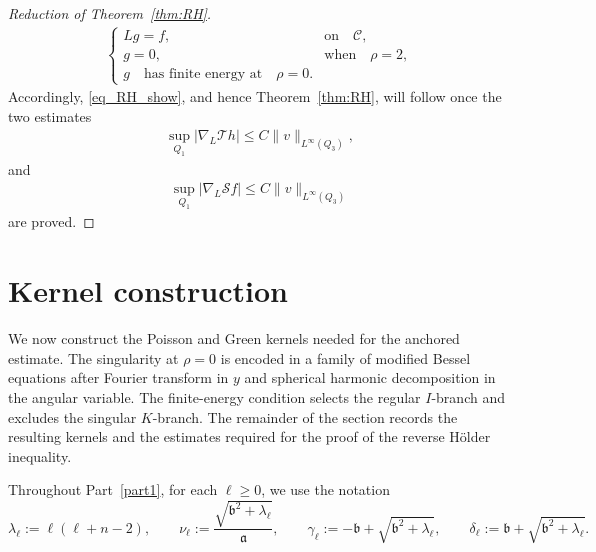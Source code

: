 \documentclass[12pt]{amsart}
\begin{document}
\begin{proof}[Reduction of Theorem~\ref{thm:RH}]
\begin{align}
\begin{cases}
Lg = f, & \textrm{on}\quad \mathcal{C},\\
g = 0, & \textrm{when}\quad \rho=2,\\
g\quad \textrm{has finite energy at}\quad \rho=0.
\end{cases}
\end{align}
Accordingly, \eqref{eq_RH_show}, and hence Theorem~\ref{thm:RH}, will follow once the two estimates
\begin{align*}
\sup_{Q_1} |\nabla_L \mathcal{T}h| \le C \| v \|_{L^\infty(Q_3)},
\end{align*}
and
\begin{align*}
\sup_{Q_1} |\nabla_L \mathcal{S}f| \le C \| v \|_{L^\infty(Q_3)}
\end{align*}
are proved.
\end{proof}





















\section{Kernel construction}



We now construct the Poisson and Green kernels needed for the anchored estimate. The singularity at $\rho=0$ is encoded in a family of modified Bessel equations after Fourier transform in $y$ and spherical harmonic decomposition in the angular variable. The
finite-energy condition selects the regular $I$-branch and excludes the singular $K$-branch. The remainder of the section records the resulting kernels and the estimates required for the proof of the reverse H\"older inequality.


Throughout Part~\ref{part1}, for each $\ell \ge 0$, we use the notation
\begin{equation*}
\lambda_\ell:= \ell(\ell+n-2),\qquad \nu_\ell:= \frac{\sqrt{\mathfrak b^2 + \lambda_\ell}}{\mathfrak a}, \qquad \gamma_\ell:= - \mathfrak b + \sqrt{\mathfrak b^2 + \lambda_\ell}, \qquad \delta_\ell := \mathfrak b+\sqrt{\mathfrak b^2+\lambda_\ell}.
\end{equation*}
\end{document}
